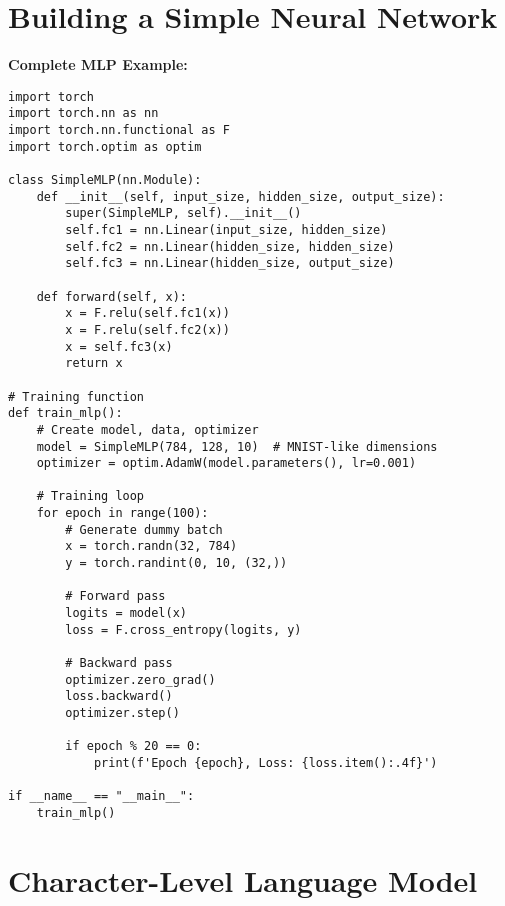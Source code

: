 \documentclass[11pt,a4paper]{book}
\begin{document}
\section{Building a Simple Neural Network}

\textbf{Complete MLP Example:}
\begin{verbatim}
import torch
import torch.nn as nn
import torch.nn.functional as F
import torch.optim as optim

class SimpleMLP(nn.Module):
    def __init__(self, input_size, hidden_size, output_size):
        super(SimpleMLP, self).__init__()
        self.fc1 = nn.Linear(input_size, hidden_size)
        self.fc2 = nn.Linear(hidden_size, hidden_size)
        self.fc3 = nn.Linear(hidden_size, output_size)
        
    def forward(self, x):
        x = F.relu(self.fc1(x))
        x = F.relu(self.fc2(x))
        x = self.fc3(x)
        return x

# Training function
def train_mlp():
    # Create model, data, optimizer
    model = SimpleMLP(784, 128, 10)  # MNIST-like dimensions
    optimizer = optim.AdamW(model.parameters(), lr=0.001)
    
    # Training loop
    for epoch in range(100):
        # Generate dummy batch
        x = torch.randn(32, 784)
        y = torch.randint(0, 10, (32,))
        
        # Forward pass
        logits = model(x)
        loss = F.cross_entropy(logits, y)
        
        # Backward pass
        optimizer.zero_grad()
        loss.backward()
        optimizer.step()
        
        if epoch % 20 == 0:
            print(f'Epoch {epoch}, Loss: {loss.item():.4f}')

if __name__ == "__main__":
    train_mlp()
\end{verbatim}

\section{Character-Level Language Model}
\end{document}
